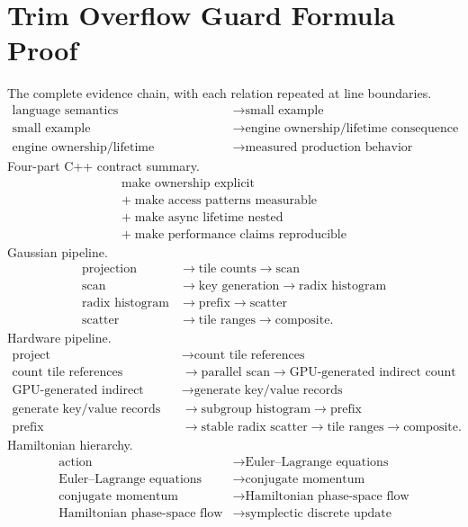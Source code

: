 \documentclass[11pt,twoside,openany]{book}
\begin{document}
\chapter*{Trim Overflow Guard Formula Proof}
\noindent The complete evidence chain, with each relation repeated at line boundaries.
\[\begin{aligned}\text{language semantics} &\rightarrow \text{small example}\\\text{small example} &\rightarrow \text{engine ownership/lifetime consequence}\\\text{engine ownership/lifetime consequence} &\rightarrow \text{measured production behavior}\end{aligned}\]
\clearpage
\noindent Four-part C++ contract summary.
\[\boxed{\begin{gathered}\text{make ownership explicit}\\+\;\text{make access patterns measurable}\\+\;\text{make async lifetime nested}\\+\;\text{make performance claims reproducible}\end{gathered}}\]
\clearpage
\noindent Gaussian pipeline.
\[\begin{aligned}\text{projection} &\rightarrow \text{tile counts} \rightarrow \text{scan}\\\text{scan} &\rightarrow \text{key generation} \rightarrow \text{radix histogram}\\\text{radix histogram} &\rightarrow \text{prefix} \rightarrow \text{scatter}\\\text{scatter} &\rightarrow \text{tile ranges} \rightarrow \text{composite}.\end{aligned}\]
\clearpage
\noindent Hardware pipeline.
\[\begin{aligned}\text{project} &\rightarrow \text{count tile references}\\\text{count tile references} &\rightarrow \text{parallel scan} \rightarrow \text{GPU-generated indirect count}\\\text{GPU-generated indirect count} &\rightarrow \text{generate key/value records}\\\text{generate key/value records} &\rightarrow \text{subgroup histogram} \rightarrow \text{prefix}\\\text{prefix} &\rightarrow \text{stable radix scatter} \rightarrow \text{tile ranges} \rightarrow \text{composite}.\end{aligned}\]
\clearpage
\noindent Hamiltonian hierarchy.
\[\boxed{\begin{aligned}\text{action} &\rightarrow \text{Euler--Lagrange equations}\\\text{Euler--Lagrange equations} &\rightarrow \text{conjugate momentum}\\\text{conjugate momentum} &\rightarrow \text{Hamiltonian phase-space flow}\\\text{Hamiltonian phase-space flow} &\rightarrow \text{symplectic discrete update}\end{aligned}}\]
\end{document}
